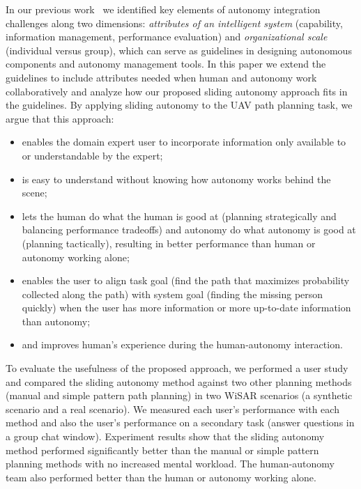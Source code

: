 In our previous work~\cite{Lin2010Supporting} we identified key elements of autonomy integration challenges along two dimensions: \textit{attributes of an intelligent system} (capability, information management, performance evaluation) and \textit{organizational scale} (individual versus group), which can serve as guidelines in designing autonomous components and autonomy management tools. In this paper we extend the guidelines to include attributes needed when human and autonomy work collaboratively and analyze how our proposed sliding autonomy approach fits in the guidelines. By applying sliding autonomy to the UAV path planning task, we argue that this approach:
\begin{itemize}
\item enables the domain expert user to incorporate information only available to or understandable by the expert;
\item is easy to understand without knowing how autonomy works behind the scene;
\item lets the human do what the human is good at (planning strategically and balancing performance tradeoffs) and autonomy do what autonomy is good at (planning tactically), resulting in better performance than human or autonomy working alone;
\item enables the user to align task goal (find the path that maximizes probability collected along the path) with system goal (finding the missing person quickly) when the user has more information or more up-to-date information than autonomy;
\item and improves human's experience during the human-autonomy interaction.
\end{itemize}

To evaluate the usefulness of the proposed approach, we performed a user study and compared the sliding autonomy method against two other planning methods (manual and simple pattern path planning) in two WiSAR scenarios (a synthetic scenario and a real scenario). We measured each user's performance with each method and also the user's performance on a secondary task (answer questions in a group chat window). Experiment results show that the sliding autonomy method performed significantly better than the manual or simple pattern planning methods with no increased mental workload. The human-autonomy team also performed better than the human or autonomy working alone.

